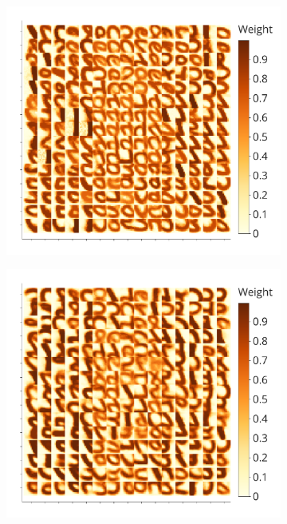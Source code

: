 \documentclass[a4paper,10pt]{article}
\begin{document}
\begin{figure}[H]
\begin{subfigure}{0.45\textwidth}
    \includegraphics[width=\textwidth,keepaspectratio=true]{weights_XY_clamp_low.pdf}
    \caption{}
    \label{fig:compe_clamp:low_weights}
\end{subfigure} 
\begin{subfigure}{0.45\textwidth} 
    \includegraphics[width=\textwidth,keepaspectratio=true]{weights_XY_clamp_high.pdf}
    \caption{}
    \label{fig:compe_clamp:high_weights}

\end{subfigure}
\end{figure}
\end{document}
